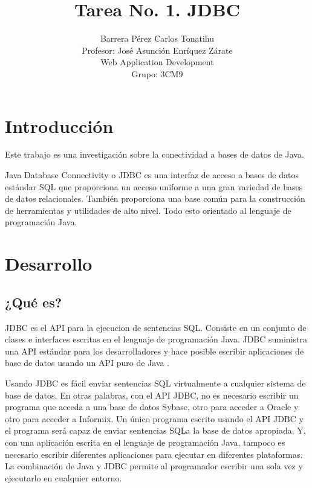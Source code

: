 \documentclass[a4paper,12pt]{article}
\title{Tarea No. 1. JDBC }
\author{Barrera Pérez Carlos Tonatihu \\ Profesor: José Asunción Enríquez Zárate \\ Web Application Development \\ Grupo: 3CM9 }
\begin{document}
\maketitle
\newpage
\tableofcontents

\newpage
\section{Introducción}
Este trabajo es una investigación sobre la conectividad a bases de datos de Java.

Java Database Connectivity o JDBC es una interfaz de acceso a bases de datos estándar SQL que proporciona un acceso uniforme a una gran variedad de bases de datos relacionales. También proporciona una base común para la construcción de herramientas y utilidades de alto nivel. Todo esto orientado al lenguaje de programación Java.

\newpage
\section{Desarrollo}
\subsection{¿Qué es?}
JDBC es el API para la ejecucion de sentencias SQL. Consiste en un conjunto de clases e interfaces escritas en el lenguaje de programación Java. JDBC suministra una API estándar para los desarrolladores y hace posible escribir aplicaciones de base de datos usando un API puro de Java \cite{PAGINA}.

Usando JDBC es fácil enviar sentencias SQL virtualmente a cualquier sistema de base de datos. En otras palabras, con el API JDBC, no es necesario escribir un programa que acceda a una base de datos Sybase, otro para acceder a Oracle y otro para acceder a Informix. Un único programa escrito usando el API JDBC y el programa será capaz de enviar sentencias SQLa la base de datos apropiada. Y, con una aplicación escrita en el lenguaje de programación Java, tampoco es necesario escribir diferentes aplicaciones para ejecutar en diferentes plataformas. La combinación de Java y JDBC permite al programador escribir una sola vez y ejecutarlo en cualquier entorno.
\end{document}
